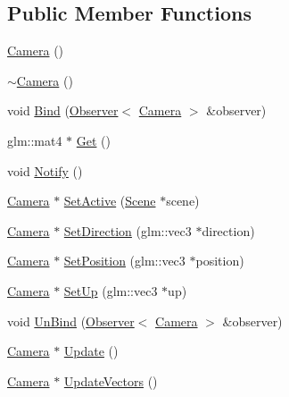 \subsection*{Public Member Functions}
\begin{DoxyCompactItemize}
\item 
\mbox{\hyperlink{classEngine_1_1Components_1_1Camera_ae8ad7f42b61412322436eadfa5261d5e}{Camera}} ()
\item 
\mbox{\hyperlink{classEngine_1_1Components_1_1Camera_ac040fa629766d0b0deefa6412f004fad}{$\sim$\+Camera}} ()
\item 
void \mbox{\hyperlink{classObservable_aedd54eccbfad67066226ee0b958347ba}{Bind}} (\mbox{\hyperlink{classObserver}{Observer}}$<$ \mbox{\hyperlink{classEngine_1_1Components_1_1Camera}{Camera}} $>$ \&observer)
\item 
glm\+::mat4 $\ast$ \mbox{\hyperlink{classEngine_1_1Components_1_1Camera_ad24b41321813d1757cb6dd0db52e34dd}{Get}} ()
\item 
void \mbox{\hyperlink{classObservable_afaa016d6c6b8a6fad20bb388d35ca014}{Notify}} ()
\item 
\mbox{\hyperlink{classEngine_1_1Components_1_1Camera}{Camera}} $\ast$ \mbox{\hyperlink{classEngine_1_1Components_1_1Camera_af3ce56d4d1a66fa4e45ec8775e4149e7}{Set\+Active}} (\mbox{\hyperlink{classEngine_1_1Components_1_1Scene}{Scene}} $\ast$scene)
\item 
\mbox{\hyperlink{classEngine_1_1Components_1_1Camera}{Camera}} $\ast$ \mbox{\hyperlink{classEngine_1_1Components_1_1Camera_a7fdbe486e45390cbfc3961cb891440bd}{Set\+Direction}} (glm\+::vec3 $\ast$direction)
\item 
\mbox{\hyperlink{classEngine_1_1Components_1_1Camera}{Camera}} $\ast$ \mbox{\hyperlink{classEngine_1_1Components_1_1Camera_ada6e11faa2124d571b7d125fc8a0c72e}{Set\+Position}} (glm\+::vec3 $\ast$position)
\item 
\mbox{\hyperlink{classEngine_1_1Components_1_1Camera}{Camera}} $\ast$ \mbox{\hyperlink{classEngine_1_1Components_1_1Camera_ac044899d9fbfa3818c99676855ec19fb}{Set\+Up}} (glm\+::vec3 $\ast$up)
\item 
void \mbox{\hyperlink{classObservable_a141ac9aaacb2bf98b41349413c3487c0}{Un\+Bind}} (\mbox{\hyperlink{classObserver}{Observer}}$<$ \mbox{\hyperlink{classEngine_1_1Components_1_1Camera}{Camera}} $>$ \&observer)
\item 
\mbox{\hyperlink{classEngine_1_1Components_1_1Camera}{Camera}} $\ast$ \mbox{\hyperlink{classEngine_1_1Components_1_1Camera_a364f5e22921e3d234b31297a64c7d932}{Update}} ()
\item 
\mbox{\hyperlink{classEngine_1_1Components_1_1Camera}{Camera}} $\ast$ \mbox{\hyperlink{classEngine_1_1Components_1_1Camera_aa80448fee84ef021ad89c29d10fbaafa}{Update\+Vectors}} ()
\end{DoxyCompactItemize}
